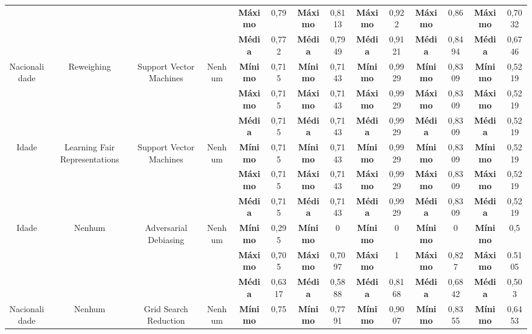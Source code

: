 \documentclass[Portugues,Final]{ic-tese-v3}
\begin{document}
\begin{table}[H]
\begin{center}
{\begin{tabular}{c|c|c|c|c|c|c|c|c|c|c|c|c|c}
             & & & & \textbf{Máximo} & 0,79 & \textbf{Máximo} & 0,8113 & \textbf{Máximo} & 0,922 & \textbf{Máximo} & 0,86 & \textbf{Máximo} & 0,7032 \\
             & & & & \textbf{Média} & 0,772 & \textbf{Média} & 0,7949 & \textbf{Média} & 0,9121 & \textbf{Média} & 0,8494 & \textbf{Média} & 0,6746 \\
            \hline
            \multirow{3}{*}{Nacionalidade} & \multirow{3}{*}{Reweighing} & \multirow{3}{*}{Support Vector Machines} & \multirow{3}{*}{Nenhum} & \textbf{Mínimo} & 0,715 & \textbf{Mínimo} & 0,7143 & \textbf{Mínimo} & 0,9929 & \textbf{Mínimo} & 0,8309 & \textbf{Mínimo} & 0,5219 \\
             & & & & \textbf{Máximo} & 0,715 & \textbf{Máximo} & 0,7143 & \textbf{Máximo} & 0,9929 & \textbf{Máximo} & 0,8309 & \textbf{Máximo} & 0,5219 \\
             & & & & \textbf{Média} & 0,715 & \textbf{Média} & 0,7143 & \textbf{Média} & 0,9929 & \textbf{Média} & 0,8309 & \textbf{Média} & 0,5219 \\
            \hline
            \multirow{3}{*}{Idade} & \multirow{3}{*}{Learning Fair Representations} & \multirow{3}{*}{Support Vector Machines} & \multirow{3}{*}{Nenhum} & \textbf{Mínimo} & 0,715 & \textbf{Mínimo} & 0,7143 & \textbf{Mínimo} & 0,9929 & \textbf{Mínimo} & 0,8309 & \textbf{Mínimo} & 0,5219 \\
             & & & & \textbf{Máximo} & 0,715 & \textbf{Máximo} & 0,7143 & \textbf{Máximo} & 0,9929 & \textbf{Máximo} & 0,8309 & \textbf{Máximo} & 0,5219 \\
             & & & & \textbf{Média} & 0,715 & \textbf{Média} & 0,7143 & \textbf{Média} & 0,9929 & \textbf{Média} & 0,8309 & \textbf{Média} & 0,5219 \\
            \hline
            \multirow{3}{*}{Idade} & \multirow{3}{*}{Nenhum} & \multirow{3}{*}{Adversarial Debiasing} & \multirow{3}{*}{Nenhum} & \textbf{Mínimo} & 0,295 & \textbf{Mínimo} & 0 & \textbf{Mínimo} & 0 & \textbf{Mínimo} & 0 & \textbf{Mínimo} & 0,5 \\
             & & & & \textbf{Máximo} & 0,705 & \textbf{Máximo} & 0,7097 & \textbf{Máximo} & 1 & \textbf{Máximo} & 0,827 & \textbf{Máximo} & 0.5105 \\
             & & & & \textbf{Média} & 0,6317 & \textbf{Média} & 0,5888 & \textbf{Média} & 0,8168 & \textbf{Média} & 0,6842 & \textbf{Média} & 0,503 \\
            \hline
            \multirow{3}{*}{Nacionalidade} & \multirow{3}{*}{Nenhum} & \multirow{3}{*}{Grid Search Reduction} & \multirow{3}{*}{Nenhum} & \textbf{Mínimo} & 0,75 & \textbf{Mínimo} & 0,7791 & \textbf{Mínimo} & 0,9007 & \textbf{Mínimo} & 0,8355 & \textbf{Mínimo} & 0,6453 \\

\end{tabular}}
\end{center}
\end{table}
\end{document}
